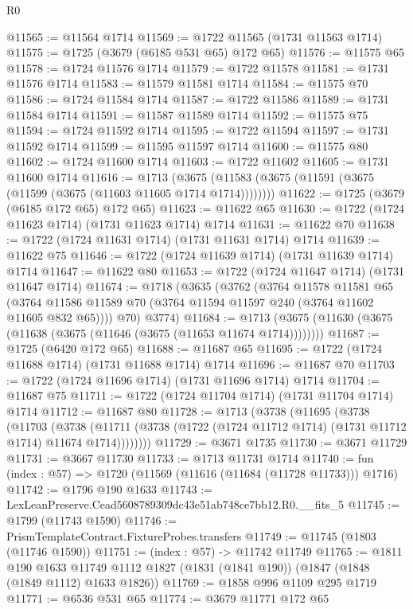 \begin{lexlean}{R0}
\begin{coremodule}
@11565 := @11564 @1714
@11569 := @1722 @11565 (@1731 @11563 @1714)
@11575 := @1725 (@3679 (@6185 @531 @65) @172 @65)
@11576 := @11575 @65
@11578 := @1724 @11576 @1714
@11579 := @1722 @11578
@11581 := @1731 @11576 @1714
@11583 := @11579 @11581 @1714
@11584 := @11575 @70
@11586 := @1724 @11584 @1714
@11587 := @1722 @11586
@11589 := @1731 @11584 @1714
@11591 := @11587 @11589 @1714
@11592 := @11575 @75
@11594 := @1724 @11592 @1714
@11595 := @1722 @11594
@11597 := @1731 @11592 @1714
@11599 := @11595 @11597 @1714
@11600 := @11575 @80
@11602 := @1724 @11600 @1714
@11603 := @1722 @11602
@11605 := @1731 @11600 @1714
@11616 := @1713
    (@3675 (@11583 (@3675 (@11591 (@3675 (@11599 (@3675 (@11603 @11605 @1714 @1714))))))))
@11622 := @1725 (@3679 (@6185 @172 @65) @172 @65)
@11623 := @11622 @65
@11630 := @1722 (@1724 @11623 @1714) (@1731 @11623 @1714) @1714
@11631 := @11622 @70
@11638 := @1722 (@1724 @11631 @1714) (@1731 @11631 @1714) @1714
@11639 := @11622 @75
@11646 := @1722 (@1724 @11639 @1714) (@1731 @11639 @1714) @1714
@11647 := @11622 @80
@11653 := @1722 (@1724 @11647 @1714) (@1731 @11647 @1714)
@11674 := @1718
    (@3635
      (@3762
        (@3764
          @11578
          @11581
          @65
          (@3764 @11586 @11589 @70 (@3764 @11594 @11597 @240 (@3764 @11602 @11605 @832 @65))))
        @70)
      @3774)
@11684 := @1713 (@3675 (@11630 (@3675 (@11638 (@3675 (@11646 (@3675 (@11653 @11674 @1714))))))))
@11687 := @1725 (@6420 @172 @65)
@11688 := @11687 @65
@11695 := @1722 (@1724 @11688 @1714) (@1731 @11688 @1714) @1714
@11696 := @11687 @70
@11703 := @1722 (@1724 @11696 @1714) (@1731 @11696 @1714) @1714
@11704 := @11687 @75
@11711 := @1722 (@1724 @11704 @1714) (@1731 @11704 @1714) @1714
@11712 := @11687 @80
@11728 := @1713
    (@3738
      (@11695
        (@3738
          (@11703
            (@3738
              (@11711 (@3738 (@1722 (@1724 @11712 @1714) (@1731 @11712 @1714) @11674 @1714))))))))
@11729 := @3671 @1735
@11730 := @3671 @11729
@11731 := @3667 @11730
@11733 := @1713 @11731 @1714
@11740 := fun (index : @57) => @1720 (@11569 (@11616 (@11684 (@11728 @11733))) @1716)
@11742 := @1796 @190 @1633
@11743 := LexLeanPreserve.Cead5608789309dc43e51ab748ce7bb12.R0.__fits_5
@11745 := @1799 (@11743 @1590)
@11746 := PrismTemplateContract.FixtureProbes.transfers
@11749 := @11745 (@1803 (@11746 @1590))
@11751 := (index : @57) -> @11742 @11749
@11765 := @1811
    @190
    @1633
    @11749
    @1112
    @1827
    (@1831 (@1841 @190))
    (@1847 (@1848 (@1849 @1112) @1633 @1826))
@11769 := @1858 @996 @1109 @295 @1719
@11771 := @6536 @531 @65
@11774 := @3679 @11771 @172 @65

\end{coremodule}
\end{lexlean}
